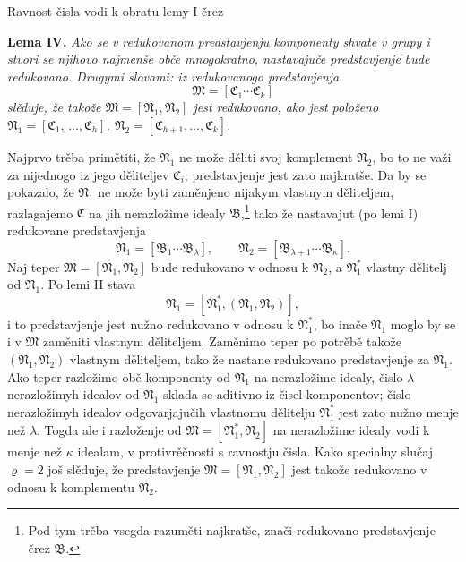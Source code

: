 \documentclass[11pt]{article}
\newcommand{\ideal}[1]{\mathfrak{#1}}
\begin{document}
Ravnost čisla vodi k obratu lemy I črez

\textbf{Lema IV.} \emph{Ako se v redukovanom predstavjenju komponenty shvate v grupy i stvori se njihovo najmenše obče mnogokratno, nastavajuče predstavjenje bude redukovano. Drugymi slovami: iz redukovanogo predstavjenja}
\[
 \ideal M=[\ideal C_1\cdots\ideal C_k]
\]
\emph{slěduje, že takože \(\ideal M=[\ideal N_1,\ideal N_2]\) jest redukovano, ako jest položeno \(\ideal N_1=[\ideal C_1,\,\ldots,\ideal C_h]\), \(\ideal N_2=[\ideal C_{h+1},\ldots,\ideal C_k]\).}

Najprvo trěba primětiti, že \(\ideal N_1\) ne može děliti svoj komplement \(\ideal N_2\), bo to ne važi za nijednogo iz jego děliteljev \(\ideal C_i\); predstavjenje jest zato najkratše. Da by se pokazalo, že \(\ideal N_1\) ne može byti zaměnjeno nijakym vlastnym děliteljem, razlagajemo \(\ideal C\) na jih nerazložime idealy \(\ideal B\),\footnote{Pod tym trěba vsegda razuměti najkratše, znači redukovano predstavjenje črez \(\ideal B\).} tako že nastavajut (po lemi I) redukovane predstavjenja
\[
 \ideal N_1=[\ideal B_1\cdots\ideal B_\lambda],
 \qquad
 \ideal N_2=[\ideal B_{\lambda+1}\cdots\ideal B_\kappa].
\]
Naj teper \(\ideal M=[\ideal N_1,\ideal N_2]\) bude redukovano v odnosu k \(\ideal N_2\), a \(\ideal N_1^*\) vlastny dělitelj od \(\ideal N_1\). Po lemi II stava
\[
 \ideal N_1=[\ideal N_1^*,(\ideal N_1,\ideal N_2)],
\]
i to predstavjenje jest nužno redukovano v odnosu k \(\ideal N_1^*\), bo inače \(\ideal N_1\) moglo by se i v \(\ideal M\) zaměniti vlastnym děliteljem. Zaměnimo teper po potrěbě takože \((\ideal N_1,\ideal N_2)\) vlastnym děliteljem, tako že nastane redukovano predstavjenje za \(\ideal N_1\). Ako teper razložimo obě komponenty od \(\ideal N_1\) na nerazložime idealy, čislo \(\lambda\) nerazložimyh idealov od \(\ideal N_1\) sklada se aditivno iz čisel komponentov; čislo nerazložimyh idealov odgovarjajučih vlastnomu dělitelju \(\ideal N_1^*\) jest zato nužno menje než \(\lambda\). Togda ale i razloženje od \(\ideal M=[\ideal N_1^*,\ideal N_2]\) na nerazložime idealy vodi k menje než \(\kappa\) idealam, v protivrěčnosti s ravnostju čisla. Kako specialny slučaj \(\varrho=2\) još slěduje, že predstavjenje \(\ideal M=[\ideal N_1,\ideal N_2]\) jest takože redukovano v odnosu k komplementu \(\ideal N_2\).

\clearpage
\end{document}
